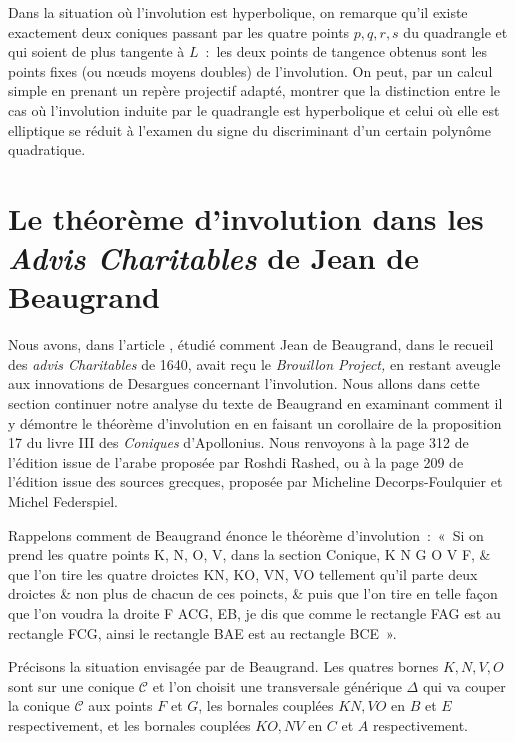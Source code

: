 \documentclass[12pt, a4paper]{article}
\newcommand{\cC}{\mathcal{C}}
\begin{document}
Dans la situation où l'involution est hyperbolique, on remarque qu'il existe exactement deux coniques passant par les quatre points $p,q,r,s$ du quadrangle et qui soient de plus tangente à $L$~:~les deux points de tangence obtenus sont les points fixes (ou n{\oe}uds moyens doubles) de l'involution. On peut, par un calcul simple en prenant un repère projectif adapté, montrer que la distinction entre le cas où l'involution induite par le quadrangle est hyperbolique et celui où elle est elliptique se réduit à l'examen du signe du discriminant d'un certain polynôme quadratique. 
\section{Le théorème d'involution dans les \textit{Advis Charitables} de Jean de Beaugrand}
Nous avons, dans l'article \cite{anglade-briend-1}, étudié comment Jean de Beaugrand, dans le recueil des \textit{advis Charitables} de 1640, avait reçu le \textit{Brouillon Project,} en restant aveugle aux innovations de Desargues concernant l'involution. Nous allons dans cette section continuer notre analyse du texte de Beaugrand en examinant comment il y démontre le théorème d'involution en en faisant un corollaire de la proposition 17 du livre III des \textit{Coniques} d'Apollonius. Nous renvoyons à la page 312 de l'édition \cite{apollonius-rashed} issue de l'arabe proposée par Roshdi Rashed, ou à la page 209 de l'édition \cite{apollonius-decorps} issue des sources grecques, proposée par Micheline Decorps-Foulquier et Michel Federspiel.


Rappelons comment de Beaugrand énonce le théorème d'involution~:~«~Si on prend les quatre points K, N, O, V, dans la section Conique, K N G O V F, \& que l'on tire les quatre droictes KN, KO, VN, VO tellement qu'il parte deux droictes \& non plus de chacun de ces poincts, \& puis que l'on tire en telle façon que l'on voudra la droite F ACG, EB, je dis que comme le rectangle FAG est au rectangle FCG, ainsi le rectangle BAE est au rectangle BCE~». 

Précisons la situation envisagée par de Beaugrand. Les quatres bornes $K,N,V,O$ sont sur une conique $\cC$ et l'on choisit une transversale générique $\Delta$ qui va couper la conique $\cC$ aux points $F$ et $G$, les bornales couplées $KN,VO$ en $B$ et $E$ respectivement, et les bornales couplées $KO,NV$ en $C$ et $A$ respectivement.
\end{document}
